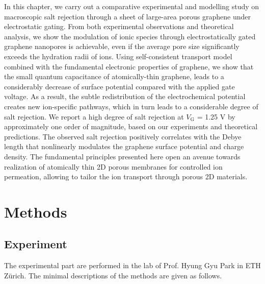In this chapter, we carry out a comparative experimental and modelling
study on macroscopic salt rejection through a sheet of large-area
porous graphene under electrostatic gating.
%
From both experimental observations and theoretical analysis, we show
the modulation of ionic species through electrostatically gated
graphene nanopores is achievable, even if the average pore size significantly exceeds the hydration radii of ions.
%
Using self-consistent transport model combined with the fundamental
electronic properties of graphene, we show that the small quantum
capacitance of atomically-thin graphene, leads to a considerably
decrease of surface potential compared with the applied gate
voltage.
%
As a result, the subtle redistribution of the electrochemical
potential creates new ion-specific pathways, which in turn
leads to a considerable degree of salt rejection.
%
We report a high
degree of salt rejection at $V_{\mathrm{G}}$ = 1.25 V by approximately
one order of magnitude, based on our experiments and theoretical
predictions.
%
The observed salt rejection positively correlates with the Debye
length that nonlinearly modulates the graphene surface potential and
charge density.
%
The fundamental principles presented here open an
avenue towards realization of atomically thin 2D porous membranes for
controlled ion permeation, allowing to tailor the ion transport
through porous 2D materials.

\section{Methods}
\label{sec:np-methods}

\subsection*{Experiment}
\label{sec:np-met-experiment}

The experimental part are performed in the lab of Prof. Hyung Gyu Park
in ETH Zürich. The minimal descriptions of the methods are given as
follows.


\vspace{1em}
\noindent
